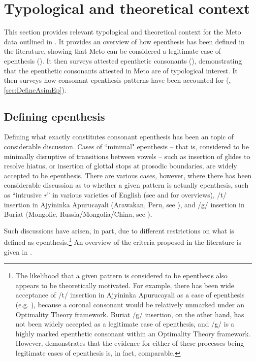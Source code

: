 \documentclass[output=paper]{langscibook}
\begin{document}
\section{Typological and theoretical context}\label{sec:TypBack}
This section provides relevant  typological and theoretical context for the 
Meto data outlined in .
It   provides an overview of 
how epenthesis has been defined in the literature, 
showing that Meto can be considered a legitimate case of epenthesis ().
It then surveys attested epenthetic consonants (),
demonstrating  that the epenthetic consonants attested in Meto are of typological interest.
 It then surveys how consonant epenthesis patterns
have been accounted for (, \ref{sec:DefineAsimEp}).

\subsection{Defining epenthesis}\label{sec:DefineEp}
Defining what exactly constitutes consonant epenthesis has been 
an topic of considerable discussion.
Cases of ``minimal" epenthesis -- that is, considered to be minimally disruptive of 
transitions between vowels --  such as insertion of 
glides to resolve hiatus, or insertion of glottal stops at prosodic boundaries,
are widely accepted to be epenthesis.
There are various cases, however, where there has been considerable
discussion as  to whether a given pattern is actually epenthesis, such as 
``intrusive \emph{r}'' in various varieties of English
(see \citealt{vasa17} and \citealt{mo17} for overviews),
/t/ insertion in Ajyíninka Apurucayali (Arawakan, Peru, see \citealp{lo02, dl06, st15, mo15}),
and /g/ insertion in Buriat (Mongolic, Russia/Mongolia/China, see \citealp{mo15, vasa17, st14, st20}).


Such discussions have arisen, in part, due to different
restrictions on what is defined as epenthesis.\footnote{%
		The likelihood that a given pattern is considered to be epenthesis also
		appears to be theoretically motivated. For example, there has been wide
		acceptance of /t/ insertion in Ajyíninka Apurucayali as a case of 
		epenthesis (e.g. \citealt{mc02, dl06}),
		because a coronal consonant would be relatively unmarked under
		an Optimality Theory framework. 
		Buriat /g/ insertion, on the other hand, has not been widely accepted as a 
		legitimate case of epenthesis, and /g/ is a highly marked epenthetic consonant within
		an Optimality Theory framework.  However, 
		\citet[117]{mo08} demonstrates that the evidence for either of these processes being legitimate 
		cases of epenthesis  is, in fact,  comparable.}
An overview of the criteria proposed in the literature is given in .
\end{document}
